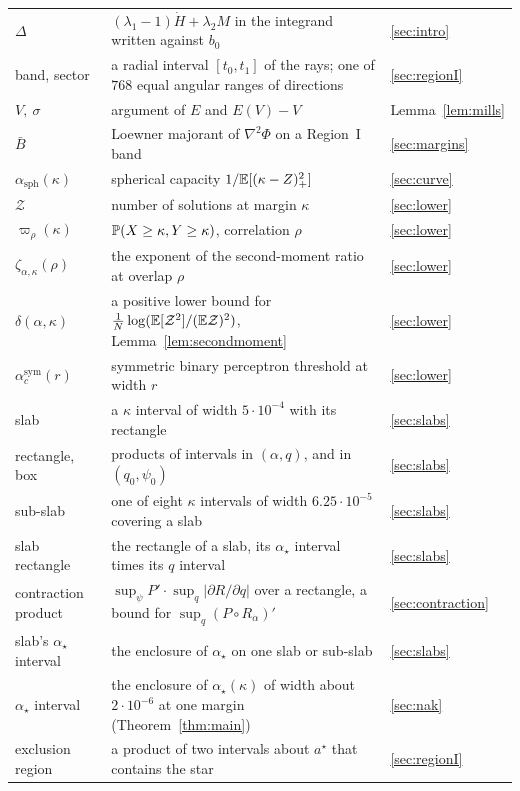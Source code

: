 \begin{longtable}{p{}p{}p{}}
$\Delta$ & $(\lambda_1-1)\dot H+\lambda_2M$ in the integrand written against $b_0$ & \ref{sec:intro}\\
band, sector & a radial interval $[t_0,t_1]$ of the rays; one of $768$ equal angular ranges of directions & \ref{sec:regionI}\\
$V,\ \sigma$ & argument of $E$ and $E(V)-V$ & Lemma~\ref{lem:mills}\\
$\bar B$ & Loewner majorant of $\nabla^2\Phi$ on a Region~I band & \ref{sec:margins}\\
$\alpha_{\mathrm{sph}}(\kappa)$ & spherical capacity $1/\mathbb{E}[(\kappa-Z)_+^2]$ & \ref{sec:curve}\\
$\mathcal Z$ & number of solutions at margin $\kappa$ & \ref{sec:lower}\\
$\varpi_\rho(\kappa)$ & $\mathbb{P}(X\ge\kappa,Y\ge\kappa)$, correlation $\rho$ & \ref{sec:lower}\\
$\zeta_{\alpha,\kappa}(\rho)$ & the exponent of the second-moment ratio at overlap $\rho$ & \ref{sec:lower}\\
$\delta(\alpha,\kappa)$ & a positive lower bound for $\frac1N\log(\mathbb{E}[\mathcal Z^2]/(\mathbb{E}\mathcal Z)^2)$, Lemma~\ref{lem:secondmoment} & \ref{sec:lower}\\
$\alpha^{\mathrm{sym}}_c(r)$ & symmetric binary perceptron threshold at width $r$ & \ref{sec:lower}\\
slab & a $\kappa$ interval of width $5\cdot10^{-4}$ with its rectangle & \ref{sec:slabs}\\
rectangle, box & products of intervals in $(\alpha,q)$, and in $(q_0,\psi_0)$ & \ref{sec:slabs}\\
sub-slab & one of eight $\kappa$ intervals of width $6.25\cdot10^{-5}$ covering a slab & \ref{sec:slabs}\\
slab rectangle & the rectangle of a slab, its $\alpha_\star$ interval times its $q$ interval & \ref{sec:slabs}\\
contraction product & $\sup_\psi P'\cdot\sup_q|\partial R/\partial q|$ over a rectangle, a bound for $\sup_q(P\circ R_\alpha)'$ & \ref{sec:contraction}\\
slab's $\alpha_\star$ interval & the enclosure of $\alpha_\star$ on one slab or sub-slab & \ref{sec:slabs}\\
$\alpha_\star$ interval & the enclosure of $\alpha_\star(\kappa)$ of width about $2\cdot10^{-6}$ at one margin (Theorem~\ref{thm:main}) & \ref{sec:nak}\\
exclusion region & a product of two intervals about $a^\star$ that contains the star & \ref{sec:regionI}\\

\end{longtable}
